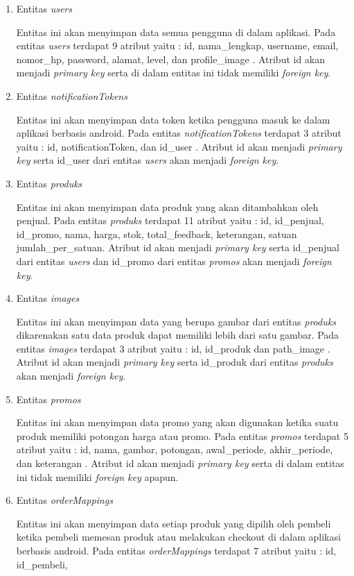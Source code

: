 \begin{enumerate}
	\newpage
	\item Entitas \textit{users}
	\par Entitas ini akan menyimpan data semua pengguna di dalam aplikasi. Pada entitas \textit{users} terdapat 9 atribut yaitu : id, nama\_lengkap, username, email,
	nomor\_hp, password, alamat, level, dan profile\_image . Atribut id akan menjadi \textit{primary key} serta di dalam entitas ini tidak memiliki \textit{foreign key}.
	\item Entitas \textit{notificationTokens}
	\par Entitas ini akan menyimpan data token ketika pengguna masuk ke dalam aplikasi berbasis android. Pada entitas \textit{notificationTokens} terdapat 3 atribut yaitu : id, notificationToken, dan id\_user . Atribut id akan menjadi \textit{primary key} serta id\_user dari entitas \textit{users} akan menjadi \textit{foreign key}.
	\item Entitas \textit{produks}
	\par Entitas ini akan menyimpan data produk yang akan ditambahkan oleh penjual. Pada entitas \textit{produks} terdapat 11 atribut yaitu : id, id\_penjual, id\_promo, nama, harga, stok, total\_feedback, keterangan, satuan jumlah\_per\_satuan. Atribut id akan menjadi \textit{primary key} serta id\_penjual dari entitas \textit{users} dan id\_promo dari entitas \textit{promos} akan menjadi \textit{foreign key}.
	\item Entitas \textit{images}
	\par Entitas ini akan menyimpan data yang berupa gambar dari entitas \textit{produks} dikarenakan satu data produk dapat memiliki lebih dari satu gambar. Pada entitas \textit{images} terdapat 3 atribut yaitu : id, id\_produk dan path\_image . Atribut id akan menjadi \textit{primary key} serta id\_produk dari entitas \textit{produks} akan menjadi \textit{foreign key}.
	\item Entitas \textit{promos}
	\par Entitas ini akan menyimpan data promo yang akan digunakan ketika suatu produk memiliki potongan harga atau promo. Pada entitas \textit{promos} terdapat 5 atribut yaitu : id, nama, gambar, potongan, awal\_periode, akhir\_periode, dan keterangan . Atribut id akan menjadi \textit{primary key} serta di dalam entitas ini tidak memiliki \textit{foreign key} apapun.
	\item Entitas \textit{orderMappings}
	\par Entitas ini akan menyimpan data setiap produk yang dipilih oleh pembeli ketika pembeli memesan produk atau melakukan checkout di dalam aplikasi berbasis android. Pada entitas \textit{orderMappings} terdapat 7 atribut yaitu : id, id\_pembeli,

\end{enumerate}
